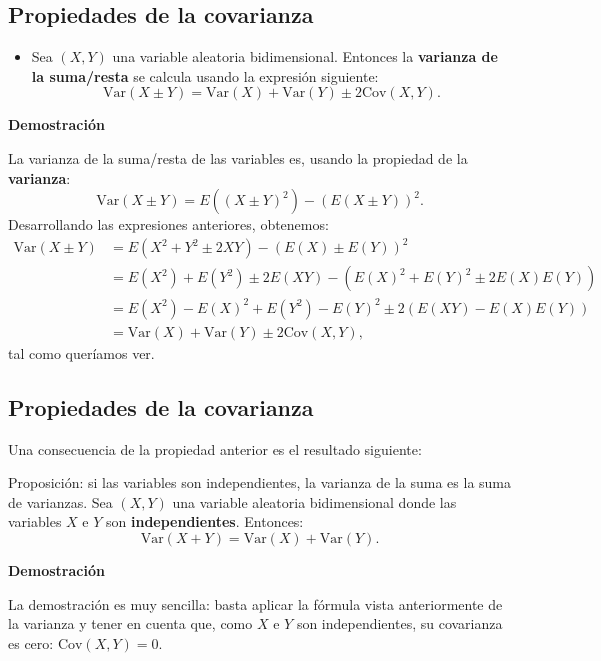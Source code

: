 \documentclass[]{book}
\providecommand{\tightlist}{%
  \setlength{\itemsep}{0pt}\setlength{\parskip}{0pt}}
\begin{document}
\hypertarget{propiedades-de-la-covarianza}{%
\subsection{Propiedades de la covarianza}\label{propiedades-de-la-covarianza}}

\begin{itemize}
\tightlist
\item
  Sea \((X,Y)\) una variable aleatoria bidimensional. Entonces la \textbf{varianza de la suma/resta} se calcula usando la expresión siguiente:
  \[
  \mathrm{Var}(X\pm Y)=\mathrm{Var}(X)+\mathrm{Var}(Y)\pm 2 \mathrm{Cov}(X,Y).
  \]
\end{itemize}

\textbf{Demostración}

La varianza de la suma/resta de las variables es, usando la propiedad de la \textbf{varianza}:
\[
\mathrm{Var}(X\pm Y)=E\left((X\pm Y)^2\right)-\left(E(X\pm Y)\right)^2.
\]
Desarrollando las expresiones anteriores, obtenemos:
\[
\begin{array}{rl}
\mathrm{Var}(X\pm Y) & =E\left(X^2+Y^2\pm 2XY\right)-\left(E(X)\pm E(Y)\right)^2 \\ & =E(X^2)+E(Y^2)\pm 2E(XY)-\left(E(X)^2+E(Y)^2\pm 2E(X)E(Y)\right) 
\\ & = E(X^2)-E(X)^2+E(Y^2)-E(Y)^2\pm 2(E(XY)-E(X)E(Y)) \\ & = \mathrm{Var}(X)+\mathrm{Var}(Y)\pm 2\mathrm{Cov}(X,Y),
\end{array}
\]
tal como queríamos ver.

\hypertarget{propiedades-de-la-covarianza-1}{%
\subsection{Propiedades de la covarianza}\label{propiedades-de-la-covarianza-1}}

Una consecuencia de la propiedad anterior es el resultado siguiente:

Proposición: si las variables son independientes, la varianza de la suma es la suma de varianzas.
Sea \((X,Y)\) una variable aleatoria bidimensional donde las variables \(X\) e \(Y\) son \textbf{independientes}.
Entonces:
\[
\mathrm{Var}(X+Y)=\mathrm{Var}(X)+\mathrm{Var}(Y).
\]

\textbf{Demostración}

La demostración es muy sencilla: basta aplicar la fórmula vista anteriormente de la varianza y tener en cuenta que, como \(X\) e \(Y\) son independientes, su covarianza es cero: \(\mathrm{Cov}(X,Y)=0\).
\end{document}
